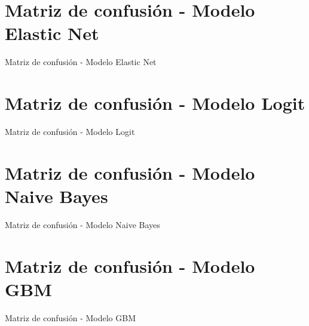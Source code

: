 \documentclass[12pt,a4paper,onecolumn]{article}
\begin{document}
\section{Matriz de confusión - Modelo Elastic Net}
\begin{table}[htbp]
\centering
\caption{Matriz de confusión - Modelo Elastic Net}
\label{tab:12_matriz_elastic_net}

\end{table}

\section{Matriz de confusión - Modelo Logit}
\begin{table}[htbp]
\centering
\caption{Matriz de confusión - Modelo Logit}
\label{tab:13_matriz_logit}

\end{table}

\section{Matriz de confusión - Modelo Naive Bayes}
\begin{table}[htbp]
\centering
\caption{Matriz de confusión - Modelo Naive Bayes}
\label{tab:14_matriz_naive_bayes}

\end{table}

\section{Matriz de confusión - Modelo GBM}
\begin{table}[htbp]
\centering
\caption{Matriz de confusión - Modelo GBM}
\label{tab:15_matriz_gbm}

\end{table}


\pagebreak
\singlespacing
\nocite{*}


\end{document}
